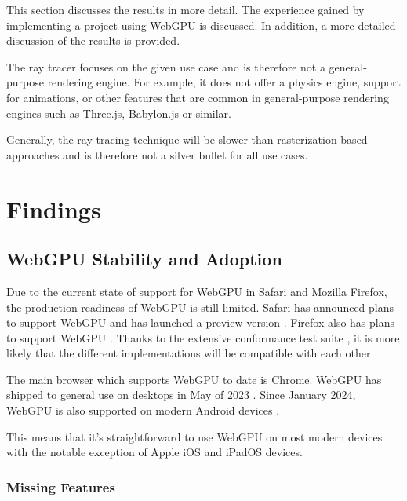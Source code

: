 
This section discusses the results in more detail. The experience gained by implementing a project using WebGPU is discussed. In addition, a more detailed discussion of the results is provided.

The ray tracer focuses on the given use case and is therefore not a general-purpose rendering engine. For example, it does not offer a physics engine, support for animations, or other features that are common in general-purpose rendering engines such as Three.js, Babylon.js or similar.

Generally, the ray tracing technique will be slower than rasterization-based approaches and is therefore not a silver bullet for all use cases.

\section{Findings}
\subsection{WebGPU Stability and Adoption}

Due to the current state of support for WebGPU in Safari and Mozilla Firefox, the production readiness of WebGPU is still limited. Safari has announced plans to support WebGPU and has launched a preview version \cite{SafariWebGPUSupport}. Firefox also has plans to support WebGPU \cite{FirefoxWebGPUSupport}. Thanks to the extensive conformance test suite \cite{WebGPUConformanceTestSuite}, it is more likely that the different implementations will be compatible with each other.

The main browser which supports WebGPU to date is Chrome. WebGPU has shipped to general use on desktops in May of 2023 \cite{ChromeWebGPUSupport}. Since January 2024, WebGPU is also supported on modern Android devices \cite{ChromeAndroidWebGPUSupport}.

This means that it's straightforward to use WebGPU on most modern devices with the notable exception of Apple iOS and iPadOS devices.

\subsubsection{Missing Features}


